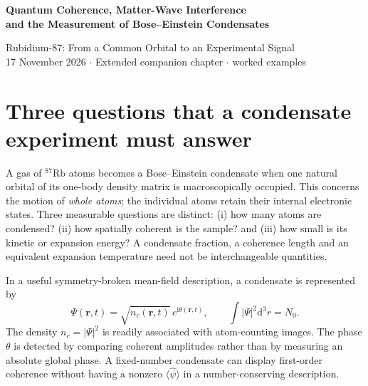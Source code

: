 \documentclass[11pt,a4paper]{article}
\newcommand{\Rb}{^{87}\mathrm{Rb}}
\newcommand{\dd}{\mathrm d}
\newcommand{\ii}{\mathrm i}
\begin{document}
\begin{center}
{\Large\bfseries\color{deepblue} Quantum Coherence, Matter-Wave Interference\\ and the Measurement of Bose--Einstein Condensates}\par\medskip
{\large Rubidium-87: From a Common Orbital to an Experimental Signal}\\[5pt]
{\small 17 November 2026 \quad $\cdot$ \quad Extended companion chapter \quad $\cdot$  worked examples}
\end{center}
\begin{abstract}
A Bose--Einstein condensate exhibits macroscopic occupation of a motional quantum state, but quantum coherence is not a photograph of 20,000 atoms occupying a single visible object. This companion chapter develops the quantitative bridge from the condensate order parameter to observable interference, first- and second-order correlation functions, time-of-flight imaging, release energies, free expansion, interactions, vortex phase winding, and atom interferometry. A separate case study describes the November 2026 optical-dipole-trap experiment aboard China's Tiangong space station and carefully distinguishes its 9.7-pK \emph{equivalent expansion temperature} from equilibrium thermometry. Every numerical example states its assumptions; no illustrative model curve is represented as an experimental data reconstruction.
\end{abstract}
\tableofcontents\newpage

\section{Three questions that a condensate experiment must answer}
A gas of $\Rb$ atoms becomes a Bose--Einstein condensate when one natural orbital of its one-body density matrix is macroscopically occupied. This concerns the motion of \emph{whole atoms}; the individual atoms retain their internal electronic states. Three measurable questions are distinct: (i) how many atoms are condensed? (ii) how spatially coherent is the sample? and (iii) how small is its kinetic or expansion energy? A condensate fraction, a coherence length and an equivalent expansion temperature need not be interchangeable quantities.

In a useful symmetry-broken mean-field description, a condensate is represented by
\begin{equation}\Psi(\mathbf r,t)=\sqrt{n_c(\mathbf r,t)}\,e^{\ii\theta(\mathbf r,t)},\qquad \int|\Psi|^2\dd^3r=N_0.\label{eq:order}\end{equation}
The density $n_c=|\Psi|^2$ is readily associated with atom-counting images. The phase $\theta$ is detected by comparing coherent amplitudes rather than by measuring an absolute global phase. A fixed-number condensate can display first-order coherence without having a nonzero $\langle\hat\psi\rangle$ in a number-conserving description.
\end{document}
